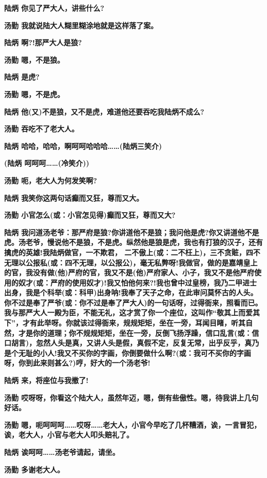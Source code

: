 \textbf{陆炳 你见了严大人，讲些什么?}

\textbf{汤勤 我就说陆大人糊里糊涂地就是这样落了案。}

\textbf{陆炳 啊?!那严大人是狼?}

\textbf{汤勤 嗯，不是狼。}

\textbf{陆炳 是虎?}

\textbf{汤勤 嗯，不是虎。}

\textbf{陆炳 他(又)不是狼，又不是虎，难道他还要吞吃我陆炳不成么?}

\textbf{汤勤 吞吃不了老大人。}

\textbf{陆炳 哈哈，哈哈，啊呵呵哈哈哈\ldots{}\ldots{}(陆炳三笑介)}

\textbf{(陆炳 呵呵呵\ldots{}\ldots{}(冷笑介))}

\textbf{汤勤 呃，老大人为何发笑啊?}

\textbf{陆炳 我笑你这两句话癫而又狂，尊而又大。}

\textbf{汤勤 小官怎么(或：小官怎见得)癫而又狂，尊而又大?}

\textbf{陆炳
我问道汤老爷：那严府是狼?你讲道他不是狼；我问他是虎?你又讲道他不是虎。汤老爷，慢说他不是狼，不是虎。纵然他是狼是虎，我也有打狼的汉子，还有擒虎的英雄!我陆炳做官，一不欺君，
二不傲上(或：二不枉上)，三不贪赃，四不无理以公报私(或：四不无理，以公报公)，毫无私弊呀!我做官，做的是嘉靖皇上的官，我没有做(他)严府的官，我又不是(他)严府家人、小子，我又不是他严府使用的奴才(或：严府的使用奴才)!我又怕他何来?!我也曾中过皇榜，我乃二甲进士出身，我是个科举(或：科甲)出身呐!我奉了天子之命，在此审问莫怀古的人头。你不过是奉了严爷(或：你不过是奉了严大人)的一句话呀，过得衙来，照看而已。我与那严大人一殿为臣，不能无礼，这才赏了你一个座位，这叫作``敬其上而爱其下''，才有此举呀。你就该过得衙来，规规矩矩，坐在一旁，耳闻目睹，听其自然，才是你的道理；你不规规矩矩，坐在一旁，反倒飞扬浮躁，信口乱言(或：信口胡言)，忽然人头是真，又讲人头是假，真假不定，反复无常，出乎反乎，真乃是个无耻的小人!我又不买你的字画，你倒要做什么啊?(或：我可不买你的字画呀，你到此来则甚么?)哼，好大的一个汤老爷!}

\textbf{陆炳 来，将座位与我撤了!}

\textbf{汤勤
哎呀呀，你看这个陆大人，虽然年迈，嗯，倒有些傲性。嗯，待我讲上几句好话。}

\textbf{汤勤
嗯，呃呵呵呵\ldots{}\ldots{}哎呀\ldots{}\ldots{}老大人，小官今早吃了几杯糟酒，诶，一言冒犯，诶，老大人，小官与老大人叩头赔礼了。}

\textbf{陆炳 诶呵呵\ldots{}\ldots{}汤老爷请起，请坐。}

\textbf{汤勤 多谢老大人。}


